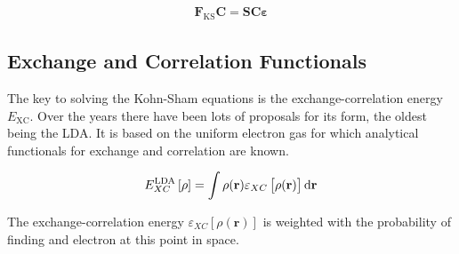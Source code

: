 \begin{align}
    \mathbf{F}_\text{KS}\mathbf{C} = \mathbf{SC\varepsilon}
\end{align}

\subsection{Exchange and Correlation Functionals}
\label{sec:exchangecorrelationfunctionals}

The key to solving the Kohn-Sham equations is the exchange-correlation energy
$E_\text{XC}$. Over the years there have been lots of proposals for its form,
the oldest being the \ac{LDA}. It is based on the uniform electron gas for
which analytical functionals for exchange and correlation are known.

\begin{align}
    E_{XC}^\text{LDA}\left[\rho\right]=\int\rho(\mathbf{r})\varepsilon_{XC}\left[\rho(\mathbf{r})\right]\dif\mathbf{r}
\end{align}

The exchange-correlation energy $\varepsilon_{XC}\left[\rho(\mathbf{r})\right]$
is weighted with the probability of finding and electron at this point in space.
